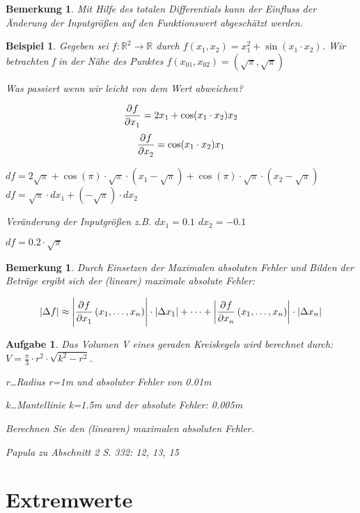 \documentclass[fontset=ubuntu,12pt,a4paper]{scrreprt}
\newtheorem{bemerkung}[defi]{Bemerkung}
\newtheorem{beispiel}[defi]{Beispiel}
\newtheorem{aufg}[defi]{Aufgabe}
\begin{document}
\begin{bemerkung}
    Mit Hilfe des totalen Differentials kann der Einfluss der Änderung der Inputgrößen auf den Funktionswert abgeschätzt werden.
\end{bemerkung}

\begin{beispiel}
    Gegeben sei \(f:\mathbb{R}^2\to\mathbb{R}\) durch \(f(x_1,x_2)=x_1^2+\sin(x_1\cdot x_2)\). Wir betrachten f in der Nähe des Punktes \(f(x_{01},x_{02})=(\sqrt{\pi},\sqrt{\pi})\)

    Was passiert wenn wir leicht von dem Wert abweichen?

    \[\dpd{f}{x_1}=2x_1+\cos(x_1\cdot x_2)x_2\]
    \[\dpd{f}{x_2}=\cos(x_1 \cdot x_2)x_1\]

    \(df=2\sqrt{\pi}+\cos(\pi)\cdot\sqrt{\pi}\cdot(x_1-\sqrt{\pi})+\cos(\pi)\cdot\sqrt{\pi}\cdot(x_2-\sqrt{\pi}) \)
    \(df=\sqrt{\pi}\cdot dx_1+(-\sqrt{\pi})\cdot dx_2\)

    Veränderung der Inputgrößen z.B. \(dx_1=0.1\) \(dx_2=-0.1\)

    \(df=0.2\cdot\sqrt{\pi}\)
\end{beispiel}

\begin{bemerkung}
    Durch Einsetzen der Maximalen absoluten Fehler und Bilden der Beträge ergibt sich der (lineare) maximale absolute Fehler:

    \[\left|\Delta f\right|\approx \left|\dpd{f}{x_1}(x_1,\dots,x_n)\right|\cdot\left|\Delta x_1\right|+\cdots+\left|\dpd{f}{x_n}(x_1,\dots,x_n)\right|\cdot\left|\Delta x_n\right|\]
\end{bemerkung}

\begin{aufg}
    Das Volumen V eines geraden Kreiskegels wird berechnet durch: \(V=\frac{\pi}{3}\cdot r^2 \cdot \sqrt{k^2-r^2}\).

    r\dots Radius r=1m und absoluter Fehler von 0.01m

    k\dots Mantellinie k=1.5m und der absolute Fehler: 0.005m

    Berechnen Sie den (linearen) maximalen absoluten Fehler.

    Papula zu Abschnitt 2 S. 332: 12, 13, 15
\end{aufg}

\section{Extremwerte}
\end{document}
